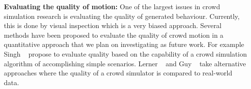 \textbf{Evaluating the quality of motion:}
One of the largest issues in crowd simulation research is evaluating the quality of generated behaviour.
Currently, this is done by visual inspection which is a very biased approach.
Several methods have been proposed to evaluate the quality of crowd motion in a quantitative approach that we plan on investigating as future work.
For example Singh \etal~\cite{Singh2009SteerBench} propose to evaluate quality based on the capability of a crowd simulation algorithm of accomplishing simple scenarios.
Lerner \etal~\cite{Lerner2010Context} and Guy \etal~\cite{Guy2012Statistical} take alternative approaches where the quality of a crowd simulator is compared to real-world data.
